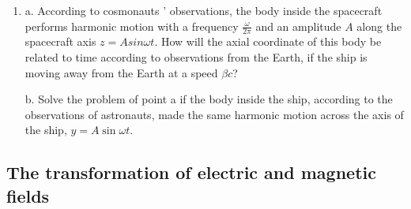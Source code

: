 \documentclass{article}
\begin{document}
\begin{enumerate}[label=14.2.\arabic*]
\item a. According to cosmonauts ' observations, the body inside the spacecraft performs harmonic motion with a frequency $\frac{\omega}{2 \pi}$ and an amplitude $A$ along the spacecraft axis $z = A sin \omega t$. How will the axial coordinate of this body be related to time according to observations from the Earth, if the ship is moving away from the Earth at a speed $\beta c$? 

b. Solve the problem of point a if the body inside the ship, according to the observations of astronauts, made the same harmonic motion across the axis of the ship, $y = A \sin \omega t$.




\end{enumerate}
\subsection{The transformation of electric and magnetic fields}
\end{document}
